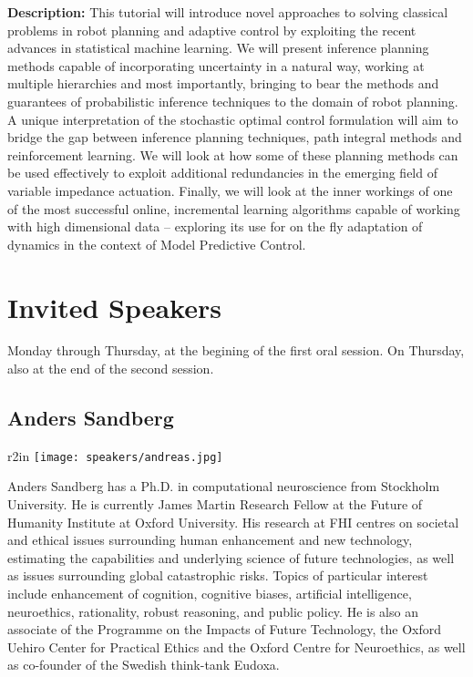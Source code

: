 \bigskip
{\bf Description:}
This tutorial will introduce novel approaches to solving classical problems in robot planning and adaptive control by exploiting the recent advances in statistical machine learning. We will present inference planning methods capable of incorporating uncertainty in a natural way, working at multiple hierarchies and most importantly, bringing to bear the methods and guarantees of probabilistic inference techniques to the domain of robot planning.  A unique interpretation of the stochastic optimal control  formulation will aim to bridge the gap between inference planning techniques, path integral methods and reinforcement learning. We will look at how some of these planning methods can be used effectively to exploit additional redundancies in the emerging field of variable impedance actuation. Finally, we will look at the inner workings of one of the most successful online, incremental learning algorithms capable of working with high dimensional data -- exploring its use for on the fly adaptation of dynamics in the context of Model Predictive Control.

\newpage
\section*{Invited Speakers}
\label{invited_talks}

Monday through Thursday, at the begining of the first oral session. On Thursday, also at the end of the second session.

\subsection*{Anders Sandberg}

\begin{wrapfigure}{r}{2in}
\centering
\texttt{[image: speakers/andreas.jpg]}
\end{wrapfigure}

Anders Sandberg has a Ph.D. in computational neuroscience from Stockholm University. He is currently James Martin Research Fellow at the Future of Humanity Institute at Oxford University. His research at FHI centres on societal and ethical issues surrounding human enhancement and new technology, estimating the capabilities and underlying science of future technologies, as well as issues surrounding global catastrophic risks. Topics of particular interest include enhancement of cognition, cognitive biases, artificial intelligence, neuroethics, rationality, robust reasoning, and public policy. He is also an associate of the Programme on the Impacts of Future Technology, the Oxford Uehiro Center for Practical Ethics and the Oxford Centre for Neuroethics, as well as co-founder of the Swedish think-tank Eudoxa.

